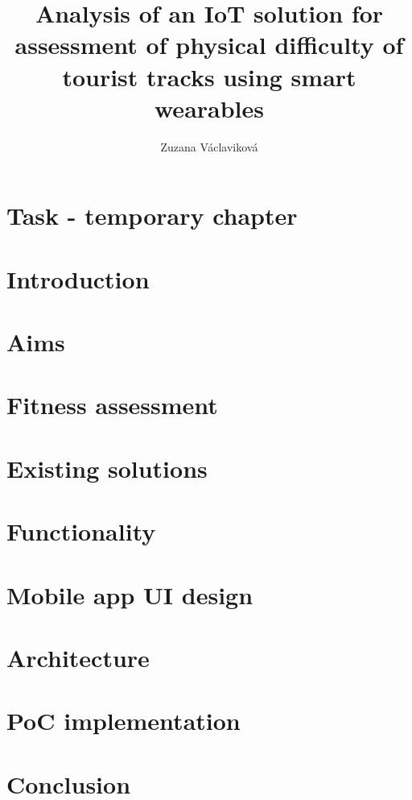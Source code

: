 \documentclass[thesis=B,english]{FITthesis}[2019/03/21]
\title{Analysis of an IoT solution for assessment of physical difficulty of tourist tracks using smart wearables}
\author{Zuzana Václaviková} %
\begin{document}


\chapter{Task - temporary chapter}


\chapter{Introduction}


\chapter{Aims}

\chapter{Fitness assessment}

\chapter{Existing solutions}

\chapter{Functionality}

\chapter{Mobile app UI design}

\chapter{Architecture}

\chapter{PoC implementation}


\chapter{Conclusion}

\end{document}
